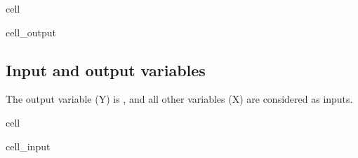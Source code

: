 \documentclass[letterpaper,10pt,english]{jupyterBook}
\begin{document}
\begin{sphinxuseclass}{cell}
\begin{sphinxVerbatimOutput}
\begin{sphinxuseclass}{cell_output}
\begin{sphinxVerbatim}
\end{sphinxVerbatim}

\end{sphinxuseclass}\end{sphinxVerbatimOutput}

\end{sphinxuseclass}

\subsection{Input and output variables}
\label{\detokenize{05:input-and-output-variables}}
\sphinxAtStartPar
The output variable (Y) is , and all other variables (X) are considered as inputs.

\begin{sphinxuseclass}{cell}\begin{sphinxVerbatimInput}

\begin{sphinxuseclass}{cell_input}
\begin{sphinxVerbatim}[commandchars=\\\{\}]
  \PYG{p}{[}\PYG{p}{]}
  \PYG{p}{[}\PYG{p}{]}

  \PYG{p}{[}\PYG{p}{]}
  \PYG{p}{[}\PYG{p}{]}

 
 

 
 
\end{sphinxVerbatim}


\end{sphinxuseclass}
\end{sphinxVerbatimInput}
\end{sphinxuseclass}
\end{document}
